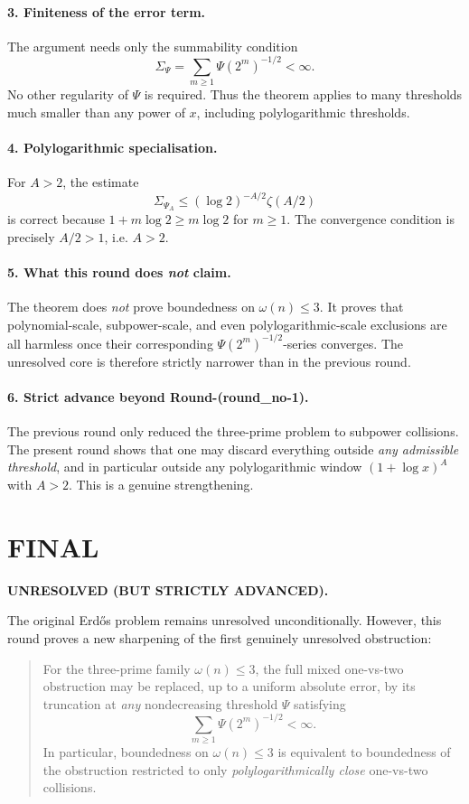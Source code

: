 \paragraph{3. Finiteness of the error term.}
The argument needs only the summability condition
\[
\Sigma_\Psi=\sum_{m\ge 1}\Psi(2^m)^{-1/2}<\infty.
\]
No other regularity of \(\Psi\) is required. Thus the theorem applies to many thresholds much smaller than any power of \(x\), including polylogarithmic thresholds.

\paragraph{4. Polylogarithmic specialisation.}
For \(A>2\), the estimate
\[
\Sigma_{\Psi_A}\le (\log 2)^{-A/2}\zeta(A/2)
\]
is correct because \(1+m\log 2\ge m\log 2\) for \(m\ge 1\). The convergence condition is precisely \(A/2>1\), i.e. \(A>2\).

\paragraph{5. What this round does \emph{not} claim.}
The theorem does \emph{not} prove boundedness on \(\omega(n)\le 3\). It proves that polynomial-scale, subpower-scale, and even polylogarithmic-scale exclusions are all harmless once their corresponding \(\Psi(2^m)^{-1/2}\)-series converges. The unresolved core is therefore strictly narrower than in the previous round.

\paragraph{6. Strict advance beyond Round-(round\_no-1).}
The previous round only reduced the three-prime problem to subpower collisions. The present round shows that one may discard everything outside \emph{any admissible threshold}, and in particular outside any polylogarithmic window \((1+\log x)^A\) with \(A>2\). This is a genuine strengthening.

\section{FINAL}

\textbf{UNRESOLVED (BUT STRICTLY ADVANCED).}

The original Erd\H{o}s problem remains unresolved unconditionally. However, this round proves a new sharpening of the first genuinely unresolved obstruction:

\begin{quote}
For the three-prime family \(\omega(n)\le 3\), the full mixed one-vs-two obstruction may be replaced, up to a uniform absolute error, by its truncation at \emph{any} nondecreasing threshold \(\Psi\) satisfying
\[
\sum_{m\ge 1}\Psi(2^m)^{-1/2}<\infty.
\]
In particular, boundedness on \(\omega(n)\le 3\) is equivalent to boundedness of the obstruction restricted to only \emph{polylogarithmically close} one-vs-two collisions.
\end{quote}

